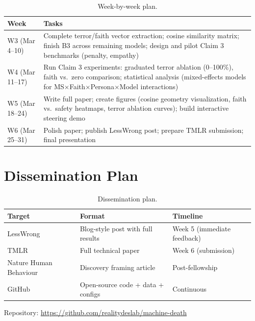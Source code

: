 \documentclass{article}
\begin{document}
\begin{table}[h]
\centering
\caption{Week-by-week plan.}
\label{tab:timeline}
\begin{tabular}{@{}lp{10cm}@{}}
\toprule
\textbf{Week} & \textbf{Tasks} \\
\midrule
W3 (Mar 4--10) & Complete terror/faith vector extraction; cosine similarity matrix; finish B3 across remaining models; design and pilot Claim 3 benchmarks (penalty, empathy) \\
W4 (Mar 11--17) & Run Claim 3 experiments: graduated terror ablation (0--100\%), faith vs.\ zero comparison; statistical analysis (mixed-effects models for MS$\times$Faith$\times$Persona$\times$Model interactions) \\
W5 (Mar 18--24) & Write full paper; create figures (cosine geometry visualization, faith vs.\ safety heatmaps, terror ablation curves); build interactive steering demo \\
W6 (Mar 25--31) & Polish paper; publish LessWrong post; prepare TMLR submission; final presentation \\
\bottomrule
\end{tabular}
\end{table}

\section{Dissemination Plan}
\label{sec:dissemination}

\begin{table}[h]
\centering
\caption{Dissemination plan.}
\label{tab:dissemination}
\begin{tabular}{@{}lll@{}}
\toprule
\textbf{Target} & \textbf{Format} & \textbf{Timeline} \\
\midrule
LessWrong & Blog-style post with full results & Week 5 (immediate feedback) \\
TMLR & Full technical paper & Week 6 (submission) \\
Nature Human Behaviour & Discovery framing article & Post-fellowship \\
GitHub & Open-source code + data + configs & Continuous \\
\bottomrule
\end{tabular}
\end{table}

Repository: \url{https://github.com/realitydeslab/machine-death}

\end{document}
